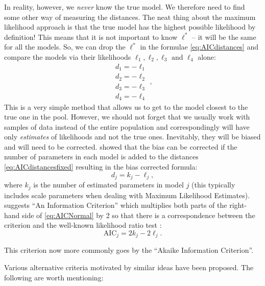 \documentclass[
]{book}
\theoremstyle{definition}
\theoremstyle{definition}
\theoremstyle{definition}
\theoremstyle{definition}
\theoremstyle{remark}
\begin{document}
In reality, however, we \emph{never} know the true model. We therefore need to find some other way of measuring the distances. The neat thing about the maximum likelihood approach is that the true model has the highest possible likelihood by definition! This means that it is not important to know \(\ell^*\) -- it will be the same for all the models. So, we can drop the \(\ell^*\) in the formulae \eqref{eq:AICdistances} and compare the models via their likelihoods \(\ell_1, \ell_2, \ell_3 \text{ and } \ell_4\) alone:
\begin{equation}
    \begin{split}
        d_1 = - \ell_1 \\
        d_2 = - \ell_2 \\
        d_3 = - \ell_3 \\
        d_4 = - \ell_4
    \end{split} ,
    \label{eq:AICdistancesfixed}
\end{equation}
This is a very simple method that allows us to get to the model closest to the true one in the pool. However, we should not forget that we usually work with samples of data instead of the entire population and correspondingly will have only \emph{estimates} of likelihoods and not the true ones. Inevitably, they will be biased and will need to be corrected. \citet{Akaike1974} showed that the bias can be corrected if the number of parameters in each model is added to the distances \eqref{eq:AICdistancesfixed} resulting in the bias corrected formula:
\begin{equation}
    d_j = k_j - \ell_j
    \label{eq:AICNormal},
\end{equation}
where \(k_j\) is the number of estimated parameters in model \(j\) (this typically includes scale parameters when dealing with Maximum Likelihood Estimates). \citet{Akaike1974} suggests ``An Information Criterion'' which multiplies both parts of the right-hand side of \eqref{eq:AICNormal} by 2 so that there is a correspondence between the criterion and the well-known likelihood ratio test \citep{WikipediaLikelihoodRatioTest2020}:
\begin{equation}
    \mathrm{AIC}_j = 2 k_j - 2 \ell_j
    \label{eq:AIC}.
\end{equation}

This criterion now more commonly goes by the ``Akaike Information Criterion''.

Various alternative criteria motivated by similar ideas have been proposed. The following are worth mentioning:
\end{document}
